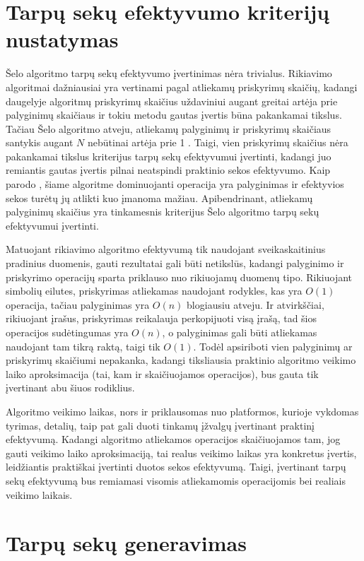 \documentclass{VUMIFInfKursinis}
\begin{document}
\section{Tarpų sekų efektyvumo kriterijų nustatymas}

Šelo algoritmo tarpų sekų efektyvumo įvertinimas nėra trivialus.
Rikiavimo algoritmai dažniausiai yra vertinami pagal atliekamų priskyrimų skaičių, kadangi
daugelyje algoritmų priskyrimų skaičius uždaviniui augant greitai artėja prie palyginimų skaičiaus ir
tokiu metodu gautas įvertis būna pakankamai tikslus.
Tačiau Šelo algoritmo atveju, atliekamų palyginimų ir priskyrimų skaičiaus santykis augant $N$ nebūtinai artėja prie 1 \cite{Radavičius_Baranauskas_2013}.
Taigi, vien priskyrimų skaičius nėra pakankamai tikslus kriterijus tarpų sekų efektyvumui įvertinti,
kadangi juo remiantis gautas įvertis pilnai neatspindi praktinio sekos efektyvumo.
Kaip parodo \cite{ciura2001best}, šiame algoritme dominuojanti operacija yra palyginimas ir efektyvios sekos
turėtų jų atlikti kuo įmanoma mažiau.
Apibendrinant, atliekamų palyginimų skaičius yra tinkamesnis kriterijus Šelo algoritmo tarpų sekų efektyvumui įvertinti.

Matuojant rikiavimo algoritmo efektyvumą tik naudojant sveikaskaitinius pradinius duomenis, gauti rezultatai gali būti netikslūs,
kadangi palyginimo ir priskyrimo operacijų sparta priklauso nuo rikiuojamų duomenų tipo.
Rikiuojant simbolių eilutes, priskyrimas atliekamas naudojant rodykles, kas yra $O(1)$ operacija,
tačiau palyginimas yra $O(n)$ blogiausiu atveju.
Ir atvirkščiai, rikiuojant įrašus, priskyrimas reikalauja perkopijuoti visą įrašą, tad šios operacijos sudėtingumas yra $O(n)$,
o palyginimas gali būti atliekamas naudojant tam tikrą raktą, taigi tik $O(1)$.
Todėl apsiriboti vien palyginimų ar priskyrimų skaičiumi nepakanka, kadangi tiksliausia praktinio algoritmo
veikimo laiko aproksimacija (tai, kam ir skaičiuojamos operacijos), bus gauta tik įvertinant abu šiuos rodiklius.

Algoritmo veikimo laikas, nors ir priklausomas nuo platformos, kurioje vykdomas tyrimas, detalių,
taip pat gali duoti tinkamų įžvalgų įvertinant praktinį efektyvumą.
Kadangi algoritmo atliekamos operacijos skaičiuojamos tam, jog gauti
veikimo laiko aproksimaciją, tai realus veikimo laikas
yra konkretus įvertis, leidžiantis praktiškai įvertinti duotos sekos efektyvumą.
Taigi, įvertinant tarpų sekų efektyvumą bus remiamasi visomis atliekamomis operacijomis bei realiais veikimo laikais.


\section{Tarpų sekų generavimas}
\end{document}
